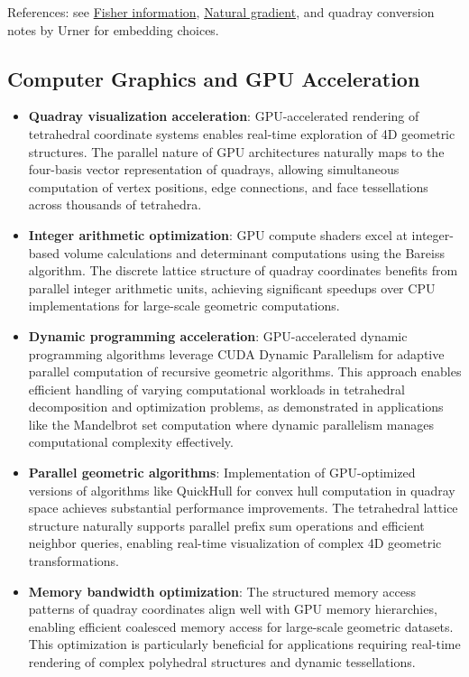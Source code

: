 \documentclass[
  10pt,
]{article}
\providecommand{\tightlist}{%
  \setlength{\itemsep}{0pt}\setlength{\parskip}{0pt}}
\begin{document}
References: see
\href{https://en.wikipedia.org/wiki/Fisher_information}{Fisher
information},
\href{https://en.wikipedia.org/wiki/Natural_gradient}{Natural gradient},
and quadray conversion notes by Urner for embedding choices.

\subsection{Computer Graphics and GPU
Acceleration}\label{computer-graphics-and-gpu-acceleration}

\begin{itemize}
\tightlist
\item
  \textbf{Quadray visualization acceleration}: GPU-accelerated rendering
  of tetrahedral coordinate systems enables real-time exploration of 4D
  geometric structures. The parallel nature of GPU architectures
  naturally maps to the four-basis vector representation of quadrays,
  allowing simultaneous computation of vertex positions, edge
  connections, and face tessellations across thousands of tetrahedra.
\item
  \textbf{Integer arithmetic optimization}: GPU compute shaders excel at
  integer-based volume calculations and determinant computations using
  the Bareiss algorithm. The discrete lattice structure of quadray
  coordinates benefits from parallel integer arithmetic units, achieving
  significant speedups over CPU implementations for large-scale
  geometric computations.
\item
  \textbf{Dynamic programming acceleration}: GPU-accelerated dynamic
  programming algorithms leverage CUDA Dynamic Parallelism for adaptive
  parallel computation of recursive geometric algorithms. This approach
  enables efficient handling of varying computational workloads in
  tetrahedral decomposition and optimization problems, as demonstrated
  in applications like the Mandelbrot set computation where dynamic
  parallelism manages computational complexity effectively.
\item
  \textbf{Parallel geometric algorithms}: Implementation of
  GPU-optimized versions of algorithms like QuickHull for convex hull
  computation in quadray space achieves substantial performance
  improvements. The tetrahedral lattice structure naturally supports
  parallel prefix sum operations and efficient neighbor queries,
  enabling real-time visualization of complex 4D geometric
  transformations.
\item
  \textbf{Memory bandwidth optimization}: The structured memory access
  patterns of quadray coordinates align well with GPU memory
  hierarchies, enabling efficient coalesced memory access for
  large-scale geometric datasets. This optimization is particularly
  beneficial for applications requiring real-time rendering of complex
  polyhedral structures and dynamic tessellations.
\end{itemize}
\end{document}
